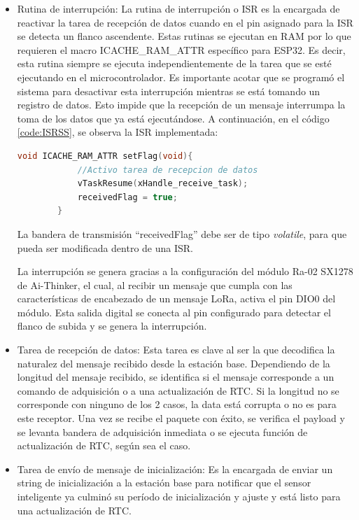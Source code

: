 \begin{itemize}
    
    
    \item Rutina de interrupción: La rutina de interrupción o ISR es la encargada de reactivar la tarea de recepción de datos cuando en el pin asignado para la ISR se detecta un flanco ascendente. Estas rutinas se ejecutan en RAM por lo que requieren el macro ICACHE\_RAM\_ATTR específico para ESP32. Es decir, esta rutina siempre se ejecuta independientemente de la tarea que se esté ejecutando en el microcontrolador. Es importante acotar que se programó el sistema para desactivar esta interrupción mientras se está tomando un registro de datos. Esto impide que la recepción de un mensaje interrumpa la toma de los datos que ya está ejecutándose. A continuación, en el código \ref{code:ISRSS}, se observa la ISR implementada:
    
    \begin{lstlisting}[language=C++, caption=ISR de recepción de datos en sensor inteligente, label=code:ISRSS]
        void ICACHE_RAM_ATTR setFlag(void){  
            //Activo tarea de recepcion de datos
            vTaskResume(xHandle_receive_task);
            receivedFlag = true;
        }
    \end{lstlisting}

    La bandera de transmisión ``receivedFlag'' debe ser de tipo \textit{volatile}, para que pueda ser modificada dentro de una ISR.

    La interrupción se genera gracias a la configuración del módulo Ra-02 SX1278 de Ai-Thinker, el cual, al recibir un mensaje que cumpla con las características de encabezado de un mensaje LoRa, activa el pin DIO0 del módulo. Esta salida digital se conecta al pin configurado para detectar el flanco de subida y se genera la interrupción.
    
    \item Tarea de recepción de datos: Esta tarea es clave al ser la que decodifica la naturalez del mensaje recibido desde la estación base. Dependiendo de la longitud del mensaje recibido, se identifica si el mensaje corresponde a un comando de adquisición o a una actualización de RTC. Si la longitud no se corresponde con ninguno de los 2 casos, la data está corrupta o no es para este receptor. Una vez se recibe el paquete con éxito, se verifica el payload y se levanta bandera de adquisición inmediata o se ejecuta función de actualización de RTC, según sea el caso.
    
    \item Tarea de envío de mensaje de inicialización: Es la encargada de enviar un string de inicialización a la estación base para notificar que el sensor inteligente ya culminó su período de inicialización y ajuste y está listo para una actualización de RTC.
    

\end{itemize}
